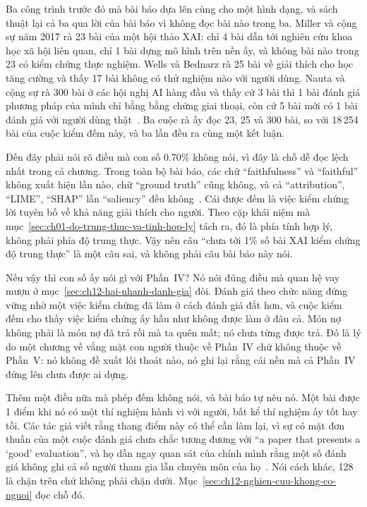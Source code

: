 %
Ba công trình trước đó mà bài báo dựa lên cùng cho một hình dạng, và sách thuật
lại cả ba qua lời của bài báo vì không đọc bài nào trong ba. Miller và cộng sự
năm 2017 rà 23 bài của một hội thảo XAI: chỉ 4 bài dẫn tới nghiên cứu khoa học
xã hội liên quan, chỉ 1 bài dựng mô hình trên nền ấy, và không bài nào trong
23 có kiểm chứng thực nghiệm. Wells và Bednarz rà 25 bài về giải thích cho học
tăng cường và thấy 17 bài không có thử nghiệm nào với người dùng. Nauta và
cộng sự rà 300 bài ở các hội nghị AI hàng đầu và thấy cứ 3 bài thì 1 bài đánh
giá phương pháp của mình chỉ bằng bằng chứng giai thoại, còn cứ 5 bài mới có 1
bài đánh giá với người dùng thật~\autocite{p24humangap}. Ba cuộc rà ấy đọc 23,
25 và 300 bài, so với 18\,254 bài của cuộc kiểm đếm này, và ba lần đều ra cùng
một kết luận.

%
Đến đây phải nói rõ điều mà con số 0.70\% không nói, vì đây là chỗ dễ đọc lệch
nhất trong cả chương. Trong toàn bộ bài báo, các chữ \enquote{faithfulness} và
\enquote{faithful} không xuất hiện lần nào, chữ \enquote{ground truth} cũng
không, và cả \enquote{attribution}, \enquote{LIME}, \enquote{SHAP} lẫn
\enquote{saliency} đều không~\autocite{p24humangap}. Cái được đếm là việc kiểm
chứng lời tuyên bố về khả năng giải thích cho người. Theo cặp khái niệm mà
mục~\ref{sec:ch01-do-trung-thuc-va-tinh-hop-ly} tách ra, đó là phía tính hợp
lý, không phải phía độ trung thực. Vậy nên câu \enquote{chưa tới 1\% số bài XAI
kiểm chứng độ trung thực} là một câu sai, và không phải câu bài báo này nói.

Nếu vậy thì con số ấy nói gì với Phần~IV? Nó nói đúng điều mà quan hệ vay mượn
ở mục~\ref{sec:ch12-hai-nhanh-danh-gia} đòi. Đánh giá theo chức năng đứng vững
nhờ một việc kiểm chứng đã làm ở cách đánh giá đắt hơn, và cuộc kiểm đếm cho
thấy việc kiểm chứng ấy hầu như không được làm ở đâu cả. Món nợ không phải là
món nợ đã trả rồi mà ta quên mất; nó chưa từng được trả. Đó là lý do một chương
về vắng mặt con người thuộc về Phần~IV chứ không thuộc về Phần~V: nó không đề
xuất lối thoát nào, nó ghi lại rằng cái nền mà cả Phần~IV đứng lên chưa được ai
dựng.

Thêm một điều nữa mà phép đếm không nói, và bài báo tự nêu nó. Một bài được 1
điểm khi nó có một thí nghiệm hành vi với người, bất kể thí nghiệm ấy tốt hay
tồi. Các tác giả viết rằng thang điểm này có thể cần làm lại, vì sự có mặt đơn
thuần của một cuộc đánh giá chưa chắc tương đương với
\enquote{a paper that presents a \enquote{good} evaluation}, và họ dẫn ngay quan sát
của chính mình rằng một số đánh giá không ghi cả số người tham gia lẫn chuyên
môn của họ~\autocite{p24humangap}. Nói cách khác, 128 là chặn trên chứ không phải chặn
dưới. Mục~\ref{sec:ch12-nghien-cuu-khong-co-nguoi} đọc chỗ đó.

%

